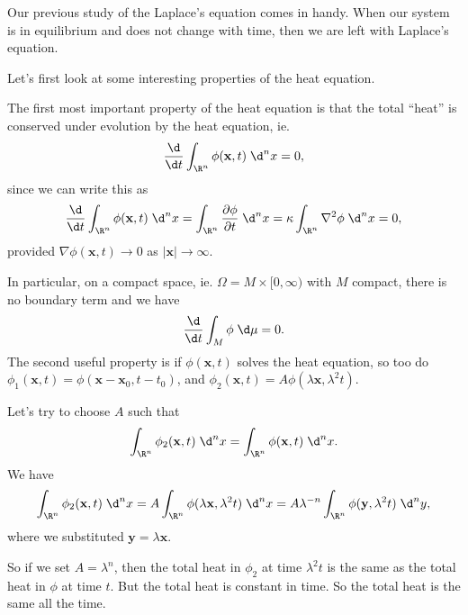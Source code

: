 \documentclass[a4paper]{article}
\begin{document}
Our previous study of the Laplace's equation comes in handy. When our system is in equilibrium and does not change with time, then we are left with Laplace's equation.

Let's first look at some interesting properties of the heat equation.

The first most important property of the heat equation is that the total ``heat'' is conserved under evolution by the heat equation, ie.
\[
  \frac{\d}{\d t}\int_{\R^n} \phi(\mathbf{x}, t)\;\d^n x = 0,
\]
since we can write this as
\[
  \frac{\d}{\d t}\int_{\R^n} \phi(\mathbf{x}, t)\;\d^n x = \int_{\R^n} \frac{\partial \phi}{\partial t}\; \d^n x = \kappa \int_{\R^n} \nabla^2 \phi \;\d^n x = 0,
\]
provided $\nabla \phi(\mathbf{x}, t) \to 0$ as $|\mathbf{x}|\to \infty$.

In particular, on a compact space, ie. $\Omega = M\times [0, \infty)$ with $M$ compact, there is no boundary term and we have
\[
  \frac{\d}{\d t}\int_M \phi \;\d\mu = 0.
\]
The second useful property is if $\phi(\mathbf{x}, t)$ solves the heat equation, so too do $\phi_1(\mathbf{x}, t) = \phi(\mathbf{x} - \mathbf{x}_0, t - t_0)$, and $\phi_2(\mathbf{x}, t) = A \phi(\lambda \mathbf{x}, \lambda^2 t)$.

Let's try to choose $A$ such that
\[
  \int_{\R^n}\phi_2(\mathbf{x}, t) \;\d^n x = \int_{\R^n}\phi(\mathbf{x}, t) \;\d^n x.
\]
We have
\[
  \int_{\R^n} \phi_2(\mathbf{x}, t)\;\d^n x = A\int_{\R^n}\phi(\lambda \mathbf{x}, \lambda^2 t)\;\d^n x = A\lambda^{-n} \int_{\R^n}\phi(\mathbf{y}, \lambda^2 t)\;\d^n y,
\]
where we substituted $\mathbf{y} = \lambda \mathbf{x}$.

So if we set $A = \lambda^n$, then the total heat in $\phi_2$ at time $\lambda^2 t$ is the same as the total heat in $\phi$ at time $t$. But the total heat is constant in time. So the total heat is the same all the time.
\end{document}
